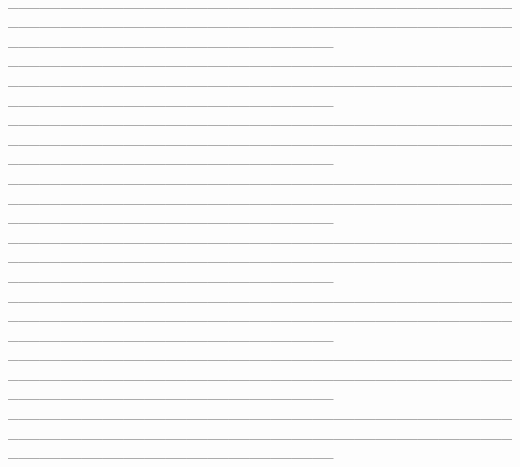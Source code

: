 \documentclass[12pt]{article}
\begin{document}
\\\_\_\_\_\_\_\_\_\_\_\_\_\_\_\_\_\_\_\_\_\_\_\_\_\_\_\_\_\_\_\_\_\_\_\_\_\_\_\_\_\_\_\_\_\_\_\_\_\_\_\_\_\_\_\_\_\_\_\_\_\_\_\_\_\_\_\_\_\_\_\_\_\_\_\_\_\_\_\_\_\_\_\_\_\_\_\_\_\_\_\_\_\_\_\_\_\_\_\_\_\_\_\_\_\_\_\_\_\_\_\_\_\_\_\_\_\_\_\_\_\_\_\_\_\_\_\_
\\\_\_\_\_\_\_\_\_\_\_\_\_\_\_\_\_\_\_\_\_\_\_\_\_\_\_\_\_\_\_\_\_\_\_\_\_\_\_\_\_\_\_\_\_\_\_\_\_\_\_\_\_\_\_\_\_\_\_\_\_\_\_\_\_\_\_\_\_\_\_\_\_\_\_\_\_\_\_\_\_\_\_\_\_\_\_\_\_\_\_\_\_\_\_\_\_\_\_\_\_\_\_\_\_\_\_\_\_\_\_\_\_\_\_\_\_\_\_\_\_\_\_\_\_\_\_\_
\\\_\_\_\_\_\_\_\_\_\_\_\_\_\_\_\_\_\_\_\_\_\_\_\_\_\_\_\_\_\_\_\_\_\_\_\_\_\_\_\_\_\_\_\_\_\_\_\_\_\_\_\_\_\_\_\_\_\_\_\_\_\_\_\_\_\_\_\_\_\_\_\_\_\_\_\_\_\_\_\_\_\_\_\_\_\_\_\_\_\_\_\_\_\_\_\_\_\_\_\_\_\_\_\_\_\_\_\_\_\_\_\_\_\_\_\_\_\_\_\_\_\_\_\_\_\_\_
\\\_\_\_\_\_\_\_\_\_\_\_\_\_\_\_\_\_\_\_\_\_\_\_\_\_\_\_\_\_\_\_\_\_\_\_\_\_\_\_\_\_\_\_\_\_\_\_\_\_\_\_\_\_\_\_\_\_\_\_\_\_\_\_\_\_\_\_\_\_\_\_\_\_\_\_\_\_\_\_\_\_\_\_\_\_\_\_\_\_\_\_\_\_\_\_\_\_\_\_\_\_\_\_\_\_\_\_\_\_\_\_\_\_\_\_\_\_\_\_\_\_\_\_\_\_\_\_
\\\_\_\_\_\_\_\_\_\_\_\_\_\_\_\_\_\_\_\_\_\_\_\_\_\_\_\_\_\_\_\_\_\_\_\_\_\_\_\_\_\_\_\_\_\_\_\_\_\_\_\_\_\_\_\_\_\_\_\_\_\_\_\_\_\_\_\_\_\_\_\_\_\_\_\_\_\_\_\_\_\_\_\_\_\_\_\_\_\_\_\_\_\_\_\_\_\_\_\_\_\_\_\_\_\_\_\_\_\_\_\_\_\_\_\_\_\_\_\_\_\_\_\_\_\_\_\_
\\\_\_\_\_\_\_\_\_\_\_\_\_\_\_\_\_\_\_\_\_\_\_\_\_\_\_\_\_\_\_\_\_\_\_\_\_\_\_\_\_\_\_\_\_\_\_\_\_\_\_\_\_\_\_\_\_\_\_\_\_\_\_\_\_\_\_\_\_\_\_\_\_\_\_\_\_\_\_\_\_\_\_\_\_\_\_\_\_\_\_\_\_\_\_\_\_\_\_\_\_\_\_\_\_\_\_\_\_\_\_\_\_\_\_\_\_\_\_\_\_\_\_\_\_\_\_\_
\\\_\_\_\_\_\_\_\_\_\_\_\_\_\_\_\_\_\_\_\_\_\_\_\_\_\_\_\_\_\_\_\_\_\_\_\_\_\_\_\_\_\_\_\_\_\_\_\_\_\_\_\_\_\_\_\_\_\_\_\_\_\_\_\_\_\_\_\_\_\_\_\_\_\_\_\_\_\_\_\_\_\_\_\_\_\_\_\_\_\_\_\_\_\_\_\_\_\_\_\_\_\_\_\_\_\_\_\_\_\_\_\_\_\_\_\_\_\_\_\_\_\_\_\_\_\_\_\\
\_\_\_\_\_\_\_\_\_\_\_\_\_\_\_\_\_\_\_\_\_\_\_\_\_\_\_\_\_\_\_\_\_\_\_\_\_\_\_\_\_\_\_\_\_\_\_\_\_\_\_\_\_\_\_\_\_\_\_\_\_\_\_\_\_\_\_\_\_\_\_\_\_\_\_\_\_\_\_\_\_\_\_\_\_\_\_\_\_\_\_\_\_\_\_\_\_\_\_\_\_\_\_\_\_\_\_\_\_\_\_\_\_\_\_\_\_\_\_\_\_\_\_\_\_\_\_\\
\end{document}
